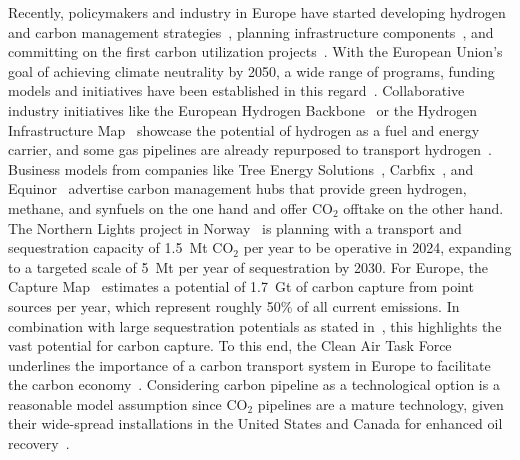 \documentclass[twocolumn]{article}
\newcommand{\COtwo}{CO$_2$}
\begin{document}
Recently, policymakers and industry in Europe have started developing hydrogen and carbon management strategies~\cite{GermanyDevelopingStrategy2023,CarbonManagementStrategie}, planning infrastructure components~\cite{CONetz}, and committing on the first carbon utilization projects~\cite{EFuelsPilotPlant2022,OrstedAssumesFull,GROUNDBREAKINGEFUELPRODUCTION,DLREfuelsDLR}. With the European Union's goal of achieving climate neutrality by 2050, a wide range of programs, funding models and initiatives have been established in this regard~\cite{eu2023netzero,europeangreendeal,europeaninnovationfund}.
Collaborative industry initiatives like the European Hydrogen Backbone~\cite{gasforclimateEuropeanHydrogenBackbone2022} or the Hydrogen Infrastructure Map~\cite{H2InfrastructureMap} showcase the potential of hydrogen as a fuel and energy carrier, and some gas pipelines are already repurposed to transport hydrogen~\cite{RohrFreiFuer}. Business models from companies like Tree Energy Solutions~\cite{TESHydrogenLife2023}, Carbfix~\cite{WeTurnCO2}, and Equinor~\cite{adomaitisEquinorRWEBuild2023} advertise carbon management hubs that provide green hydrogen, methane, and synfuels on the one hand and offer \COtwo{} offtake on the other hand. The Northern Lights project in Norway~\cite{NorthernLightsWhat} is planning with a transport and sequestration capacity of 1.5~Mt \COtwo{} per year to be operative in 2024, expanding to a targeted scale of 5~Mt per year of sequestration by 2030.
For Europe, the Capture Map~\cite{ToolsGreenTransition} estimates a potential of 1.7~Gt of carbon capture from point sources per year, which represent roughly 50\% of all current emissions. In combination with large sequestration potentials as stated in~\cite{weiProposedGlobalLayout2021}, this highlights the vast potential for carbon capture.
To this end, the Clean Air Task Force underlines the importance of a carbon transport system in Europe to facilitate the carbon economy~\cite{lockwoodEuropeanStrategyCarbon}. Considering carbon pipeline as a technological option is a reasonable model assumption since \COtwo{} pipelines are a mature technology, given their wide-spread installations in the United States and Canada for enhanced oil recovery~\cite{righettiSitingCarbonDioxide2017,friedmannNETZEROGEOSPHERICRETURN}.
\end{document}
